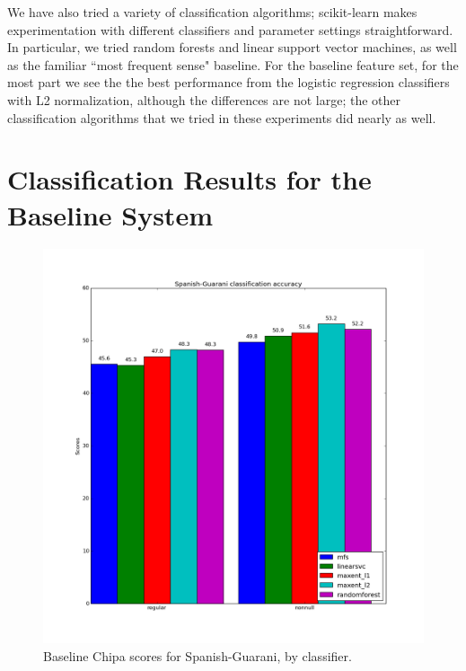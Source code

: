 We have also tried a variety of classification algorithms; scikit-learn makes
experimentation with different classifiers and parameter settings
straightforward. In particular, we tried random forests and linear support
vector machines, as well as the familiar ``most frequent sense" baseline. For
the baseline feature set, for the most part we see the the best performance
from the logistic regression classifiers with L2 normalization, although the
differences are not large; the other classification algorithms that we tried in
these experiments did nearly as well.

\section{Classification Results for the Baseline System}

\begin{figure}
  \includegraphics[width=\textwidth]{baseline-esgn-ch4.png}
  \caption{Baseline Chipa scores for Spanish-Guarani, by classifier.}
  \label{fig:esgnresults:ch4}
\end{figure}

